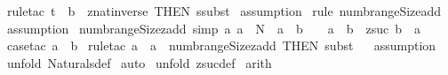 \begin{isabellebody}
%
\isadelimproof
%
\endisadelimproof
%
\isatagproof
{}\isamarkupfalse%
\ {\isacharparenleft}rule{\isacharunderscore}tac\ t\ {\isacharequal}\ {\isachardoublequoteopen}b{\isachardoublequoteclose}\ \ znat{\isacharunderscore}inverse\ {\isacharbrackleft}THEN\ ssubst{\isacharbrackright}{\isacharparenright}\isanewline
{}\isamarkupfalse%
\ assumption\isanewline
{}\isamarkupfalse%
\ {\isacharparenleft}rule\ numb{\isacharunderscore}range{\isacharunderscore}Size{\isacharunderscore}add{\isacharparenright}\isanewline
{}\isamarkupfalse%
\ assumption\isanewline
{}\isamarkupfalse%
%
\endisatagproof
{\isafoldproof}%
%
\isadelimproof
\isanewline
%
\endisadelimproof
\isanewline
\isanewline
{}\isamarkupfalse%
\ numb{\isacharunderscore}range{\isacharunderscore}Size{\isacharunderscore}zadd\ {\isacharbrackleft}simp{\isacharbrackright}{\isacharcolon}\ {\isachardoublequoteopen}{\isacharbang}{\isacharbang}a{\isachardot}\ {\isacharbrackleft}{\isacharbar}a\ {\isacharcolon}\ {\isacharpercent}N\ {\isacharsemicolon}\ a\ {\isacharless}{\isacharequal}\ {\isacharparenleft}b\ {\isacharplus}\ {}{\isacharparenright}{\isacharbar}{\isacharbrackright}\ {\isacharequal}{\isacharequal}{\isachargreater}\ {\isacharhash}{\isacharparenleft}a\ {\isachardot}{\isachardot}\ b{\isacharparenright}\ {\isacharequal}\ zsuc\ {\isacharparenleft}b\ {\isacharminus}\ a{\isacharparenright}{\isachardoublequoteclose}\isanewline
%
\isadelimproof
%
\endisadelimproof
%
\isatagproof
{}\isamarkupfalse%
\ {\isacharparenleft}case{\isacharunderscore}tac\ {\isachardoublequoteopen}a\ {\isacharless}{\isacharequal}\ b{\isachardoublequoteclose}{\isacharparenright}\isanewline
{}\isamarkupfalse%
\ {\isacharparenleft}rule{\isacharunderscore}tac\ a{}\ {\isacharequal}\ {\isachardoublequoteopen}a{\isachardoublequoteclose}\ \ numb{\isacharunderscore}range{\isacharunderscore}Size{\isacharunderscore}zadd{}\ {\isacharbrackleft}THEN\ subst{\isacharbrackright}{\isacharparenright}\isanewline
{}\isamarkupfalse%
\ {}\isanewline
{}\isamarkupfalse%
\ assumption\isanewline
{}\isamarkupfalse%
\ {\isacharparenleft}unfold\ Naturals{\isacharunderscore}def{\isacharparenright}\isanewline
{}\isamarkupfalse%
\ auto\isanewline
{}\isamarkupfalse%
\ {\isacharparenleft}unfold\ zsuc{\isacharunderscore}def{\isacharparenright}\isanewline
{}\isamarkupfalse%
\ arith\isanewline

\end{isabellebody}
